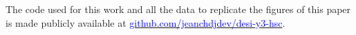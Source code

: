The code used for this work and all the data to replicate the figures of this paper is made publicly available at \href{https://github.com/JeanCHDJdev/desi-y3-hsc/}{\textcolor{blue}{github.com/jeanchdjdev/desi-y3-hsc}}.